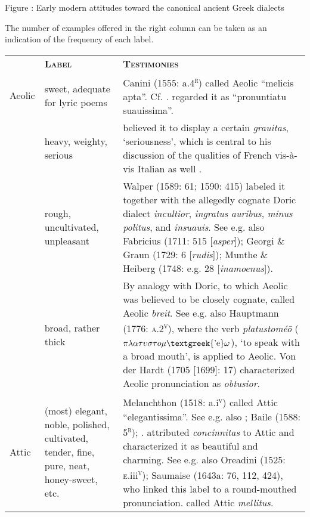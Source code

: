 \documentclass[output=paper]{langsci/langscibook}
\begin{document}
\begin{stylecaption}
Figure : Early modern attitudes toward the canonical ancient Greek dialects
\end{stylecaption}

The number of examples offered in the right column can be taken as an indication of the frequency of each label.

\tablefirsthead{}

\tabletail{}
\tablelasttail{}
\begin{tabularx}{\textwidth}{XXX}
\lsptoprule

\multicolumn{1}{X}{\textbf{\textsc{Dialect}}} & \textbf{\textsc{Label}} & \textbf{\textsc{Testimonies}}\\
\multicolumn{1}{X}{Aeolic} & sweet, adequate for lyric poems & Canini (1555: a.4\textsc{\textsuperscript{r}}) called Aeolic “melicis apta”. Cf. \citet[103]{Hoius1620}. \citet[106]{Giraudeau1739} regarded it as “pronuntiatu suauissima”.\\
& heavy, weighty, serious & \citet[16]{Estienne1581} believed it to display a certain \textit{grauitas}, ‘seriousness’, which is central to his discussion of the qualities of French vis-à-vis Italian as well \citep[71]{Swiggers2009}.\\
\hhline{~--} & rough, uncultivated, unpleasant & Walper (1589: 61; 1590: 415) labeled it together with the allegedly cognate Doric dialect \textit{incultior}, \textit{ingratus} \textit{auribus}, \textit{minus} \textit{politus}, and \textit{insuauis}. See e.g. also Fabricius (1711: 515 [\textit{asper}]); Georgi \& Graun (1729: 6 [\textit{rudis}]); Munthe \& Heiberg (1748: e.g. 28 [\textit{inamoenus}]).\\
\hhline{~--} & broad, rather thick & By analogy with Doric, to which Aeolic was believed to be closely cognate, \citet[582]{Nibbe1725} called Aeolic \textit{breit}. See e.g. also Hauptmann (1776: \textsc{a.2}\textsc{\textsuperscript{v}}), where the verb \textit{platustoméo\={} } ($\pi \lambda \alpha \tau \upsilon \sigma \tau o\mu \text{\textgreek{'e}}\omega $), ‘to speak with a broad mouth’, is applied to Aeolic. Von der Hardt (1705 [1699]: 17) characterized Aeolic pronunciation as \textit{obtusior}.\\
\multicolumn{1}{X}{Attic} & (most) elegant, noble, polished, cultivated, tender, fine, pure, neat, honey-sweet, etc. & Melanchthon (1518: a.i\textsc{\textsuperscript{v}}) called Attic “elegantissima”. See e.g. also \citet[209]{Vergara1537}; Baile (1588: 5\textsc{\textsuperscript{r}}); \citet[334]{Alsted1630}. \citet[226]{Ruland1556} attributed \textit{concinnitas} to Attic and characterized it as beautiful and charming. See e.g. also Oreadini (1525: \textsc{e}.iii\textsc{\textsuperscript{v}}); Saumaise (1643a: 76, 112, 424), who linked this label to a round-mouthed pronunciation. \citet[96]{Hoius1620} called Attic \textit{mellitus}.\\

\end{tabularx}
\end{document}
